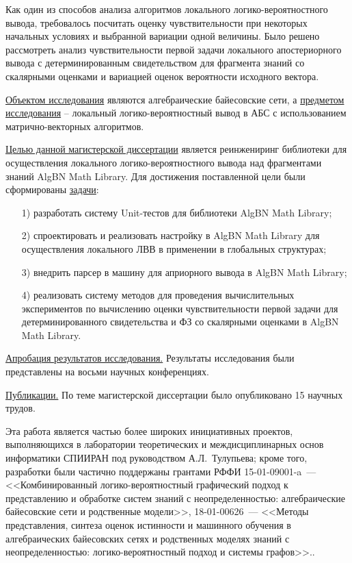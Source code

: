      Как один из способов анализа алгоритмов локального логико-вероятностного вывода, требовалось посчитать оценку чувствительности при некоторых начальных условиях и выбранной вариации одной величины. Было решено рассмотреть анализ чувствительности первой задачи локального апостериорного вывода с детерминированным свидетельством для фрагмента знаний со скалярными оценками и вариацией оценок вероятности исходного вектора. 
        
        \underline{Объектом исследования} являются алгебраические байесовские сети, а \underline{предметом исследования} -- локальный логико-вероятностный вывод в АБС с использованием матрично-векторных алгоритмов.
        
        \underline{Целью данной магистерской диссертации} является реинжениринг библиотеки для осуществления локального логико-вероятностного вывода над фрагментами знаний AlgBN Math Library. Для достижения поставленной цели были сформированы \underline{задачи}:
            \begin{enumerate}
                \item[1)] разработать систему Unit-тестов для библиотеки AlgBN Math Library;
                \item[2)] спроектировать и реализовать настройку в AlgBN Math Library для осуществления локального ЛВВ в применении в глобальных структурах;
                \item[3)] внедрить парсер в машину для априорного вывода в AlgBN Math Library;
                \item[4)] реализовать систему методов для проведения вычислительных экспериментов по вычислению оценки чувствительности первой задачи для детерминированного свидетельства и ФЗ со скалярными оценками в AlgBN Math Library.
            \end{enumerate}
        
        \underline{Апробация результатов исследования.} Результаты исследования были представлены на восьми научных конференциях.
        
        \underline{Публикации.} По теме магистерской диссертации было опубликовано 15 научных трудов.
        
       \bigskip
         {\small Эта работа является частью более широких инициативных проектов, выполняющихся в лаборатории теоретических и междисциплинарных основ информатики СПИИРАН под руководством А.Л.~Тулупьева; кроме того, разработки были частично поддержаны грантами РФФИ 15-01-09001-a~--- <<Комбинированный логико-вероятностный графический подход к представлению и обработке систем знаний с неопределенностью: алгебраические байесовские сети и родственные модели>>, 18-01-00626~--- <<Методы представления, синтеза оценок истинности и машинного обучения в алгебраических байесовских сетях и родственных моделях знаний с неопределенностью: логико-вероятностный подход и системы графов>>..}